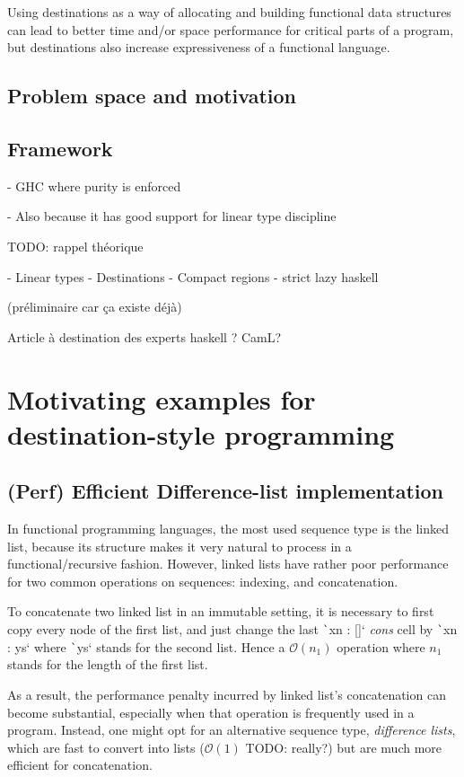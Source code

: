 \documentclass[english]{jflart}
\begin{document}
Using destinations as a way of allocating and building functional data structures can lead to better time and/or space performance for critical parts of a program, but destinations also increase expressiveness of a functional language.

\subsection{Problem space and motivation}

\subsection{Framework}

- GHC where purity is enforced

- Also because it has good support for linear type discipline

TODO: rappel théorique

- Linear types
- Destinations
- Compact regions
- strict lazy haskell

(préliminaire car ça existe déjà)

Article à destination des experts haskell ? CamL?

\section{Motivating examples for destination-style programming}

\subsection{(Perf) Efficient Difference-list implementation}

In functional programming languages, the most used sequence type is the linked list, because its structure makes it very natural to process in a functional/recursive fashion. However, linked lists have rather poor performance for two common operations on sequences: indexing, and concatenation.

To concatenate two linked list in an immutable setting, it is necessary to first copy every node of the first list, and just change the last \texttt`xn : []` \emph{cons} cell by \texttt`xn : ys` where \texttt`ys` stands for the second list. Hence a $\mathcal{O}(n_1)$ operation where $n_1$ stands for the length of the first list.

As a result, the performance penalty incurred by linked list's concatenation can become substantial, especially when that operation is frequently used in a program. Instead, one might opt for an alternative sequence type, \emph{difference lists}, which are fast to convert into lists ($\mathcal{O}(1)$ TODO: really?) but are much more efficient for concatenation.
\end{document}
